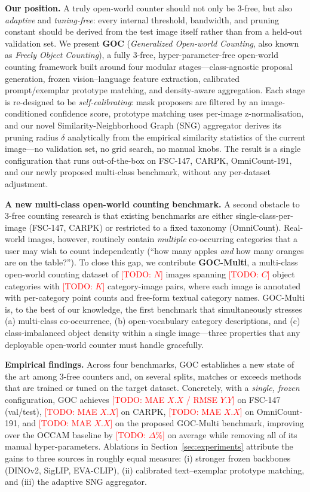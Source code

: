 \documentclass[letterpaper]{article}
\newcommand{\todo}[1]{\textcolor{red}{[TODO: #1]}}
\begin{document}
\textbf{Our position.} A truly open-world counter should not only be 3-free, but also \emph{adaptive} and \emph{tuning-free}: every internal threshold, bandwidth, and pruning constant should be derived from the test image itself rather than from a held-out validation set. We present \textbf{GOC} (\emph{Generalized Open-world Counting}, also known as \emph{Freely Object Counting}), a fully 3-free, hyper-parameter-free open-world counting framework built around four modular stages---class-agnostic proposal generation, frozen vision--language feature extraction, calibrated prompt/exemplar prototype matching, and density-aware aggregation. Each stage is re-designed to be \emph{self-calibrating}: mask proposers are filtered by an image-conditioned confidence score, prototype matching uses per-image z-normalisation, and our novel Similarity-Neighborhood Graph (SNG) aggregator derives its pruning radius $\delta$ analytically from the empirical similarity statistics of the current image---no validation set, no grid search, no manual knobs. The result is a single configuration that runs out-of-the-box on FSC-147, CARPK, OmniCount-191, and our newly proposed multi-class benchmark, without any per-dataset adjustment.

\textbf{A new multi-class open-world counting benchmark.} A second obstacle to 3-free counting research is that existing benchmarks are either single-class-per-image (FSC-147, CARPK) or restricted to a fixed taxonomy (OmniCount). Real-world images, however, routinely contain \emph{multiple} co-occurring categories that a user may wish to count independently (``how many apples \emph{and} how many oranges are on the table?''). To close this gap, we contribute \textbf{GOC-Multi}, a multi-class open-world counting dataset of \todo{$N$} images spanning \todo{$C$} object categories with \todo{$K$} category-image pairs, where each image is annotated with per-category point counts and free-form textual category names. GOC-Multi is, to the best of our knowledge, the first benchmark that simultaneously stresses (a) multi-class co-occurrence, (b) open-vocabulary category descriptions, and (c) class-imbalanced object density within a single image---three properties that any deployable open-world counter must handle gracefully.

\textbf{Empirical findings.} Across four benchmarks, GOC establishes a new state of the art among 3-free counters and, on several splits, matches or exceeds methods that are trained or tuned on the target dataset. Concretely, with a \emph{single, frozen} configuration, GOC achieves \todo{MAE $X.X$ / RMSE $Y.Y$} on FSC-147 (val/test), \todo{MAE $X.X$} on CARPK, \todo{MAE $X.X$} on OmniCount-191, and \todo{MAE $X.X$} on the proposed GOC-Multi benchmark, improving over the OCCAM baseline by \todo{$\Delta\%$} on average while removing all of its manual hyper-parameters. Ablations in Section~\ref{sec:experiments} attribute the gains to three sources in roughly equal measure: (i) stronger frozen backbones (DINOv2, SigLIP, EVA-CLIP), (ii) calibrated text--exemplar prototype matching, and (iii) the adaptive SNG aggregator.
\end{document}
